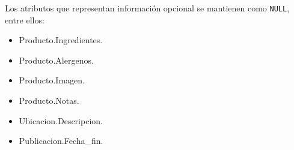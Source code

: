 \documentclass[12pt]{article} %
\begin{document}
Los atributos que representan información opcional se mantienen como
\texttt{NULL}, entre ellos:

\begin{itemize}
    \item Producto.Ingredientes.
    \item Producto.Alergenos.
    \item Producto.Imagen.
    \item Producto.Notas.
    \item Ubicacion.Descripcion.
    \item Publicacion.Fecha\_fin.
\end{itemize}

\newpage
{}


\end{document}
